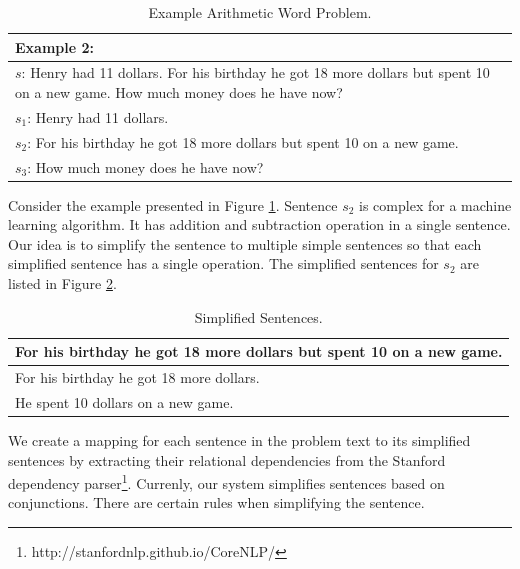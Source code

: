 \documentclass[11pt]{article}
\begin{document}
\begin{table}[h!]
\centering
\begin{tabular}{ | m{25em} | }
\hline
\textbf{Example 2:}\\
\hline
\begin{math}s\end{math}: Henry had 11 dollars. For his birthday he got 18 more dollars but spent 10 on a new game. How much money does he have now?\\
\hline
\begin{math}s_{1}\end{math}: Henry had 11 dollars.\\
\hline
\begin{math}s_{2}\end{math}: For his birthday he got 18 more dollars but spent 10 on a new game.\\
\hline
\begin{math}s_{3}\end{math}: How much money does he have now?\\
\hline
\end{tabular}
\caption{Example Arithmetic Word Problem.}
\label{figure:6}
\end{table}

Consider the example presented in Figure \ref{figure:6}. Sentence \begin{math}s_{2}\end{math} is complex for a machine learning algorithm. It has addition and subtraction operation in a single sentence. Our idea is to simplify the sentence to multiple simple sentences so that each simplified sentence has a single operation. The simplified sentences for \begin{math}s_{2}\end{math} are listed in Figure \ref{figure:7}.

\begin{table}[h!]
\centering
\begin{tabular}{ | m{25em} | }
\hline
 \textbf{For his birthday he got 18 more dollars but spent 10 on a new game.}\\
\hline
 For his birthday he got 18 more dollars.\\
\hline
He spent 10 dollars on a new game.\\
\hline
\end{tabular}
\caption{Simplified Sentences.}
\label{figure:7}
\end{table}

We create a mapping for each sentence in the problem text to its simplified sentences by extracting their relational dependencies from the Stanford dependency parser\footnote{http://stanfordnlp.github.io/CoreNLP/ }. Currenly, our system simplifies sentences based on conjunctions. There are certain rules when simplifying the sentence.
\end{document}

